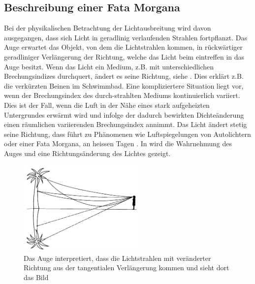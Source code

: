 \subsection{Beschreibung einer Fata Morgana}
Bei der physikalischen Betrachtung der Lichtausbreitung wird davon ausgegangen, dass sich Licht in
geradlinig verlaufenden Strahlen fortpflanzt. Das Auge erwartet das Objekt, von dem die Lichtstrahlen
kommen, in rückwärtiger geradliniger Verlängerung der Richtung, welche das Licht beim eintreffen in das Auge besitzt.
Wenn das Licht ein Medium, z.B. mit unterschiedlichen Brechungsindizes durchquert, ändert es seine Richtung, siehe . Dies erklärt z.B. die verkürzten Beinen im Schwimmbad.
Eine kompliziertere Situation liegt vor, wenn der Brechungsindex des durch-strahlten Mediums kontinuierlich variiert. 
Dies ist der Fall, wenn die Luft in der Nähe eines stark aufgeheizten Untergrundes erwärmt
wird und infolge der dadurch bewirkten Dichteänderung einen räumlichen variierenden Brechungsindex annimmt. 
Das Licht ändert stetig seine Richtung, dass führt zu Phänomenen wie Luftspiegelungen von Autolichtern oder einer Fata Morgana, an heissen Tagen \cite{fataEinleitung}.
In  wird die Wahrnehmung des Auges und eine Richtungsänderung des Lichtes gezeigt.
\begin{figure}[H]
\begin{center}
\includegraphics[width=0.55\textwidth]{./picture/FataEinleitung.png}
	\caption{Das Auge interpretiert, dass die Lichtstrahlen mit veränderter Richtung aus der tangentialen Verlängerung kommen und sieht dort das Bild}
	\label{Ab:fataEinleitung}
\end{center}	
\end{figure}
